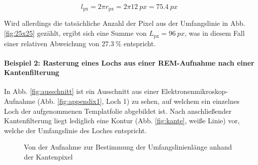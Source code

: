 \documentclass[accentcolor=tud1c, 11pt, toc=bib, toc=listof, captions=abovetable, parskip=half]{tudreport}
\begin{document}
\begin{equation}
	l_{\text{px}} = 2 \pi r_{\text{px}} = 2 \pi \SI{12}{px} = \SI{75.4}{px}
\label{eq:sollWertPixelumfang}
\end{equation}

Wird allerdings die tatsächliche Anzahl der Pixel aus der Umfangslinie in Abb. \ref{fig:25x25} gezählt, ergibt sich eine Summe von $L_{\text{px}}= \SI{96}{px}$, was in diesem Fall einer relativen Abweichung von $\SI{+27.3}{\percent}$ entspricht. 

\paragraph{Beispiel 2: Rasterung eines Lochs aus einer REM-Aufnahme nach einer Kantenfilterung}

In Abb. \ref{fig:ausschnitt} ist ein Ausschnitt aus einer Elektronenmikroskop-Aufnahme (Abb. \ref{fig:appendix1}, Loch 1) zu sehen, auf welchem ein einzelnes Loch der aufgenommenen Templatfolie abgebildet ist. Nach anschließender Kantenfilterung liegt lediglich eine Kontur (Abb. \ref{fig:kante}, weiße Linie) vor, welche der Umfangslinie des Loches entspricht.\\

\begin{figure}[H]
	\centering
	
	\caption{Von der Aufnahme zur Bestimmung der Umfangslinienlänge anhand der Kantenpixel}
\end{figure}
\end{document}
